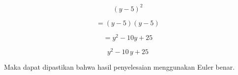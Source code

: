 \documentclass[a4paper,10pt]{article}
\begin{document}
\begin{eulernotebook}
\begin{eulercomment}
\begin{eulercomment}
\begin{eulercomment}
\begin{eulercomment}
\begin{eulercomment}
\begin{eulercomment}
\begin{eulercomment}
\begin{eulercomment}
\begin{eulercomment}
\begin{eulercomment}
\begin{eulercomment}
\begin{eulercomment}
\begin{eulercomment}
\end{eulercomment}
\begin{eulercomment}
\end{eulercomment}
\begin{eulerformula}
\[
(y - 5)^2
\]
\end{eulerformula}
\begin{eulercomment}
\end{eulercomment}
\begin{eulerformula}
\[
= (y - 5) (y - 5)
\]
\end{eulerformula}
\begin{eulercomment}
\end{eulercomment}
\begin{eulerformula}
\[
= y^2 - 10y + 25
\]
\end{eulerformula}
\begin{eulerformula}
\[
y^2-10\,y+25
\]
\end{eulerformula}
\begin{eulercomment}
Maka dapat dipastikan bahwa hasil penyelesaian menggunakan Euler
benar.
\end{eulercomment}
\begin{eulercomment}



\end{eulercomment}
\end{eulercomment}
\end{eulercomment}
\end{eulercomment}
\end{eulercomment}
\end{eulercomment}
\end{eulercomment}
\end{eulercomment}
\end{eulercomment}
\end{eulercomment}
\end{eulercomment}
\end{eulercomment}
\end{eulercomment}
\end{eulernotebook}
\end{document}
